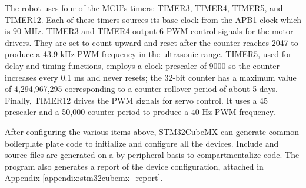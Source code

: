 The robot uses four of the MCU's timers: TIMER3, TIMER4, TIMER5, and TIMER12. Each of these timers sources its base clock from the APB1 clock which is 90 MHz. TIMER3 and TIMER4 output 6 PWM control signals for the motor drivers. They are set to count upward and reset after the counter reaches 2047 to produce a 43.9 kHz PWM frequency in the ultrasonic range. TIMER5, used for delay and timing functions, employs a clock prescaler of 9000 so the counter increases every 0.1 ms and never resets; the 32-bit counter has a maximum value of 4,294,967,295 corresponding to a counter rollover period of about 5 days. Finally, TIMER12 drives the PWM signals for servo control. It uses a 45 prescaler and a 50,000 counter period to produce a 40 Hz PWM frequency.

After configuring the various items above, STM32CubeMX can generate common boilerplate plate code to initialize and configure all the devices. Include and source files are generated on a by-peripheral basis to compartmentalize code. The program also generates a report of the device configuration, attached in Appendix \ref{appendix:stm32cubemx_report}.

